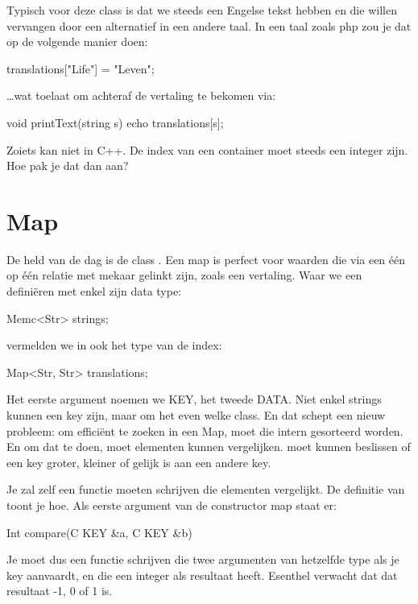 Typisch voor deze class is dat we steeds een Engelse tekst hebben en die willen vervangen door een alternatief in een andere taal. In een taal zoals php zou je dat op de volgende manier doen:

\begin{code}
translations["Life"] = "Leven";
\end{code}

\ldots wat toelaat om achteraf de vertaling te bekomen via:
\begin{code}
void printText(string s) {
   echo translations[s];
}
\end{code}

Zoiets kan niet in C++. De index van een container moet steeds een integer zijn. Hoe pak je dat dan aan?

\section{Map}
De held van de dag is de class . Een map is perfect voor waarden die via een \'e\'en op \'e\'en relatie met mekaar gelinkt zijn, zoals een vertaling. Waar we een  defini\"eren met enkel zijn data type:

\begin{code}
Memc<Str> strings;
\end{code}

vermelden we in  ook het type van de index:

\begin{code}
Map<Str, Str> translations;
\end{code}

Het eerste argument noemen we KEY, het tweede DATA. Niet enkel strings kunnen een key zijn, maar om het even welke class. En dat schept een nieuw probleem: om effici\"ent te zoeken in een Map, moet die intern gesorteerd worden. En om dat te doen, moet  elementen kunnen vergelijken.  moet kunnen beslissen of een key groter, kleiner of gelijk is aan een andere key. 

Je zal zelf een functie moeten schrijven die elementen vergelijkt. De definitie van  toont je hoe. Als eerste argument van de constructor map staat er:

\begin{code}
Int compare(C KEY &a, C KEY &b)
\end{code}

Je moet dus een functie schrijven die twee argumenten van hetzelfde type als je key aanvaardt, en die een integer als resultaat heeft. Esenthel verwacht dat dat resultaat -1, 0 of 1 is. 

